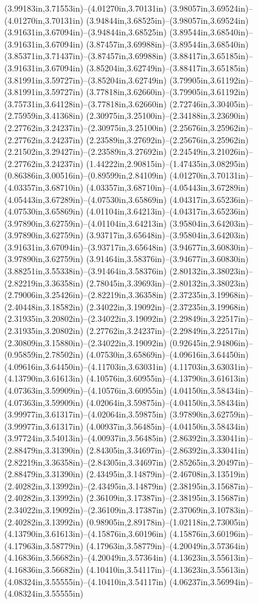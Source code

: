 (3.99183in,3.71553in)--(4.01270in,3.70131in) (3.98057in,3.69524in)--(4.01270in,3.70131in) (3.94844in,3.68525in)--(3.98057in,3.69524in) (3.91631in,3.67094in)--(3.94844in,3.68525in) (3.89544in,3.68540in)--(3.91631in,3.67094in) (3.87457in,3.69988in)--(3.89544in,3.68540in) (3.85371in,3.71437in)--(3.87457in,3.69988in) (3.88417in,3.65185in)--(3.91631in,3.67094in) (3.85204in,3.62749in)--(3.88417in,3.65185in) (3.81991in,3.59727in)--(3.85204in,3.62749in) (3.79905in,3.61192in)--(3.81991in,3.59727in) (3.77818in,3.62660in)--(3.79905in,3.61192in) (3.75731in,3.64128in)--(3.77818in,3.62660in) (2.72746in,3.30405in)--(2.75959in,3.41368in) (2.30975in,3.25100in)--(2.34188in,3.23690in) (2.27762in,3.24237in)--(2.30975in,3.25100in) (2.25676in,3.25962in)--(2.27762in,3.24237in) (2.23589in,3.27692in)--(2.25676in,3.25962in) (2.21502in,3.29427in)--(2.23589in,3.27692in) (2.24549in,3.21026in)--(2.27762in,3.24237in) (1.44222in,2.90815in)--(1.47435in,3.08295in) (0.86386in,3.00516in)--(0.89599in,2.84109in) (4.01270in,3.70131in)--(4.03357in,3.68710in) (4.03357in,3.68710in)--(4.05443in,3.67289in) (4.05443in,3.67289in)--(4.07530in,3.65869in) (4.04317in,3.65236in)--(4.07530in,3.65869in) (4.01104in,3.64213in)--(4.04317in,3.65236in) (3.97890in,3.62759in)--(4.01104in,3.64213in) (3.95804in,3.64203in)--(3.97890in,3.62759in) (3.93717in,3.65648in)--(3.95804in,3.64203in) (3.91631in,3.67094in)--(3.93717in,3.65648in) (3.94677in,3.60830in)--(3.97890in,3.62759in) (3.91464in,3.58376in)--(3.94677in,3.60830in) (3.88251in,3.55338in)--(3.91464in,3.58376in) (2.80132in,3.38023in)--(2.82219in,3.36358in) (2.78045in,3.39693in)--(2.80132in,3.38023in) (2.79006in,3.25426in)--(2.82219in,3.36358in) (2.37235in,3.19968in)--(2.40448in,3.18582in) (2.34022in,3.19092in)--(2.37235in,3.19968in) (2.31935in,3.20802in)--(2.34022in,3.19092in) (2.29849in,3.22517in)--(2.31935in,3.20802in) (2.27762in,3.24237in)--(2.29849in,3.22517in) (2.30809in,3.15880in)--(2.34022in,3.19092in) (0.92645in,2.94806in)--(0.95859in,2.78502in) (4.07530in,3.65869in)--(4.09616in,3.64450in) (4.09616in,3.64450in)--(4.11703in,3.63031in) (4.11703in,3.63031in)--(4.13790in,3.61613in) (4.10576in,3.60955in)--(4.13790in,3.61613in) (4.07363in,3.59909in)--(4.10576in,3.60955in) (4.04150in,3.58434in)--(4.07363in,3.59909in) (4.02064in,3.59875in)--(4.04150in,3.58434in) (3.99977in,3.61317in)--(4.02064in,3.59875in) (3.97890in,3.62759in)--(3.99977in,3.61317in) (4.00937in,3.56485in)--(4.04150in,3.58434in) (3.97724in,3.54013in)--(4.00937in,3.56485in) (2.86392in,3.33041in)--(2.88479in,3.31390in) (2.84305in,3.34697in)--(2.86392in,3.33041in) (2.82219in,3.36358in)--(2.84305in,3.34697in) (2.85265in,3.20497in)--(2.88479in,3.31390in) (2.43495in,3.14879in)--(2.46708in,3.13519in) (2.40282in,3.13992in)--(2.43495in,3.14879in) (2.38195in,3.15687in)--(2.40282in,3.13992in) (2.36109in,3.17387in)--(2.38195in,3.15687in) (2.34022in,3.19092in)--(2.36109in,3.17387in) (2.37069in,3.10783in)--(2.40282in,3.13992in) (0.98905in,2.89178in)--(1.02118in,2.73005in) (4.13790in,3.61613in)--(4.15876in,3.60196in) (4.15876in,3.60196in)--(4.17963in,3.58779in) (4.17963in,3.58779in)--(4.20049in,3.57364in) (4.16836in,3.56682in)--(4.20049in,3.57364in) (4.13623in,3.55613in)--(4.16836in,3.56682in) (4.10410in,3.54117in)--(4.13623in,3.55613in) (4.08324in,3.55555in)--(4.10410in,3.54117in) (4.06237in,3.56994in)--(4.08324in,3.55555in) 